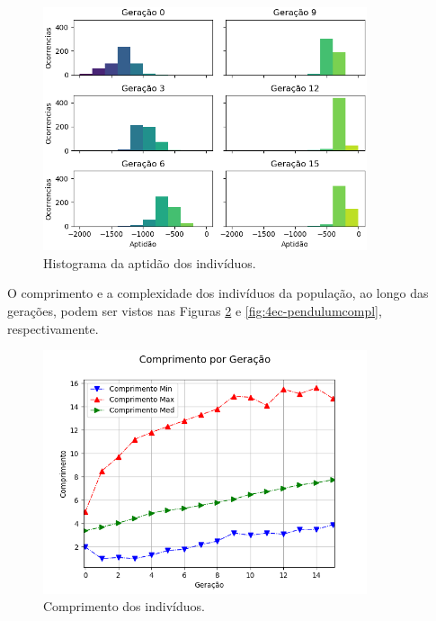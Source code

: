 \begin{figure}[H]
	\centering
	\includegraphics[width=0.85\textwidth]{02_desenvolvimento/04_EC_Fig_PendulumAptHist.png}
	\caption{Histograma da aptidão dos indivíduos.}
	\label{fig:4ec-pendulumapthist}
\end{figure}

O comprimento e a complexidade dos indivíduos da população, ao longo das gerações, podem ser vistos nas Figuras \ref{fig:4ec-pendulumcompr} e \ref{fig:4ec-pendulumcompl}, respectivamente.

\begin{figure}[H]
	\centering
	\includegraphics[width=0.85\textwidth]{02_desenvolvimento/04_EC_Fig_PendulumCompr.png}
	\caption{Comprimento dos indivíduos.}
	\label{fig:4ec-pendulumcompr}
\end{figure}

